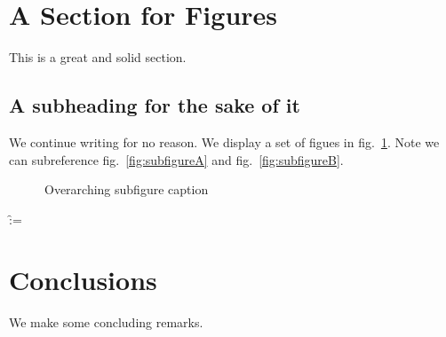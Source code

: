 \documentclass[
]{article}
\makeatletter
\newcounter{pandoccrossref@subfigures@footnote@counter}
\newenvironment{pandoccrossrefsubfigures}{%
\setcounter{pandoccrossref@subfigures@footnote@counter}{0}
\begin{figure}\centering%
\gdef\global@pandoccrossref@subfigures@footnotes{}%
\DeclareRobustCommand{\footnote}[1]{\footnotemark%
\stepcounter{pandoccrossref@subfigures@footnote@counter}%
\ifx\global@pandoccrossref@subfigures@footnotes\empty%
\gdef\global@pandoccrossref@subfigures@footnotes{{##1}}%
\else%
\g@addto@macro\global@pandoccrossref@subfigures@footnotes{, {##1}}%
\fi}}%
{\end{figure}%
\addtocounter{footnote}{-\value{pandoccrossref@subfigures@footnote@counter}}
\@for\f:=\global@pandoccrossref@subfigures@footnotes\do{\stepcounter{footnote}\footnotetext{\f}}%
\gdef\global@pandoccrossref@subfigures@footnotes{}}
\makeatother
\begin{document}
\hypertarget{a-section-for-figures}{%
\section{A Section for Figures}\label{a-section-for-figures}}

This is a great and solid section.

\hypertarget{a-subheading-for-the-sake-of-it}{%
\subsection{A subheading for the sake of
it}\label{a-subheading-for-the-sake-of-it}}

We continue writing for no reason. We display a set of figues in
fig.~\ref{fig:subfigures}. Note we can subreference
fig.~\ref{fig:subfigureA} and fig.~\ref{fig:subfigureB}.

\begin{pandoccrossrefsubfigures}



\caption[{Overarching subfigure caption}]{Overarching subfigure caption}

\label{fig:subfigures}

\end{pandoccrossrefsubfigures}

\hypertarget{conclusions}{%
\section{Conclusions}\label{conclusions}}

We make some concluding remarks.

\listoffigures

\listoftables

\printbibliography[title=References]
\end{document}
